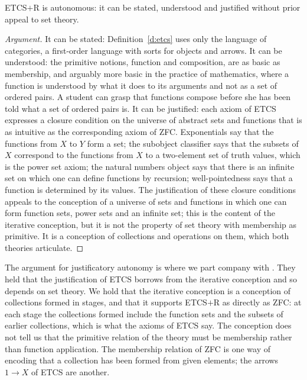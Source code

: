 \documentclass{situationist-preprint}
\begin{document}
\begin{lemma}\label{l:autonomy}
ETCS$+$R is autonomous: it can be stated, understood and justified without prior appeal to set theory.
\end{lemma}

\begin{proof}[Argument]
It can be stated: Definition~\ref{d:etcs} uses only the language of categories, a first-order language with sorts for objects and arrows. It can be understood: the primitive notions, function and composition, are as basic as membership, and arguably more basic in the practice of mathematics, where a function is understood by what it does to its arguments and not as a set of ordered pairs. A student can grasp that functions compose before she has been told what a set of ordered pairs is. It can be justified: each axiom of ETCS expresses a closure condition on the universe of abstract sets and functions that is as intuitive as the corresponding axiom of ZFC. Exponentials say that the functions from $X$ to $Y$ form a set; the subobject classifier says that the subsets of $X$ correspond to the functions from $X$ to a two-element set of truth values, which is the power set axiom; the natural numbers object says that there is an infinite set on which one can define functions by recursion; well-pointedness says that a function is determined by its values. The justification of these closure conditions appeals to the conception of a universe of sets and functions in which one can form function sets, power sets and an infinite set; this is the content of the iterative conception, but it is not the property of set theory with membership as primitive. It is a conception of collections and operations on them, which both theories articulate.
\end{proof}

The argument for justificatory autonomy is where we part company with \citet{LinneboPettigrew2011}. They held that the justification of ETCS borrows from the iterative conception and so depends on set theory. We hold that the iterative conception is a conception of collections formed in stages, and that it supports ETCS$+$R as directly as ZFC: at each stage the collections formed include the function sets and the subsets of earlier collections, which is what the axioms of ETCS say. The conception does not tell us that the primitive relation of the theory must be membership rather than function application. The membership relation of ZFC is one way of encoding that a collection has been formed from given elements; the arrows $1 \to X$ of ETCS are another.
\end{document}
